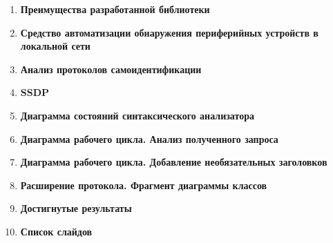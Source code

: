 \documentclass[14pt]{extarticle}
\begin{document}
\begin{enumerate}
	\item \textbf{Преимущества разработанной библиотеки}

	\item \textbf{Средство автоматизации обнаружения периферийных устройств в локальной сети}

	\item \textbf{Анализ протоколов самоидентификации}

	\item \textbf{SSDP}

	\item \textbf{Диаграмма состояний синтаксического анализатора}

	\item \textbf{Диаграмма рабочего цикла. Анализ полученного запроса}

	\item \textbf{Диаграмма рабочего цикла. Добавление необязательных заголовков}

	\item \textbf{Расширение протокола. Фрагмент диаграммы классов}

	\item \textbf{Достигнутые результаты}
	
	\item \textbf{Список слайдов}
\end{enumerate}
\end{document}
